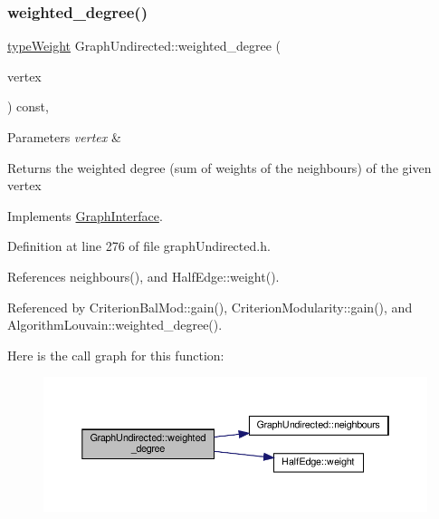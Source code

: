 \subsubsection{\texorpdfstring{weighted\+\_\+degree()}{weighted\_degree()}}
{\footnotesize\ttfamily \hyperlink{edge_8h_a2e7ea3be891ac8b52f749ec73fee6dd2}{type\+Weight} Graph\+Undirected\+::weighted\+\_\+degree (\begin{DoxyParamCaption}\item[{const \hyperlink{edge_8h_a5fbd20c46956d479cb10afc9855223f6}{type\+Vertex} \&}]{vertex }\end{DoxyParamCaption}) const\hspace{0.3cm}{\ttfamily [inline]}, {\ttfamily [virtual]}}


\begin{DoxyParams}{Parameters}
{\em vertex} & \\
\hline
\end{DoxyParams}
\begin{DoxyReturn}{Returns}
the weighted degree (sum of weights of the neighbours) of the given vertex 
\end{DoxyReturn}


Implements \hyperlink{classGraphInterface_a3a4bd9e37e69a4488a48f781e36ea686}{Graph\+Interface}.



Definition at line 276 of file graph\+Undirected.\+h.



References neighbours(), and Half\+Edge\+::weight().



Referenced by Criterion\+Bal\+Mod\+::gain(), Criterion\+Modularity\+::gain(), and Algorithm\+Louvain\+::weighted\+\_\+degree().

Here is the call graph for this function\+:
\nopagebreak
\begin{figure}[H]
\begin{center}
\leavevmode
\includegraphics[width=350pt]{classGraphUndirected_ad2b1cd9a6dded42bd5431134aba26612_cgraph}
\end{center}
\end{figure}


